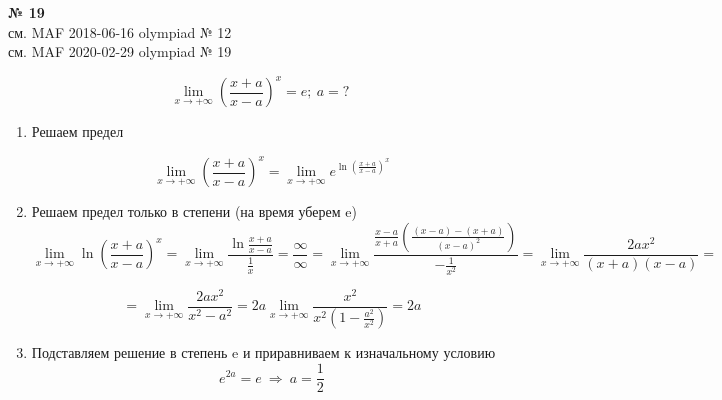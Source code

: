 \documentclass{article}
\begin{document}
\textbf{№ 19} 
\large
\\
см. {\color{blue}MAF} 2018-06-16 olympiad № 12 \\
см. {\color{blue}MAF} 2020-02-29 olympiad № 19

$$ \lim\limits_{x \to +\infty} \left( \frac{x+a}{x-a} \right)^x = e; \ a = ? $$  

\begin{enumerate}
\item Решаем предел

$$ \lim\limits_{x \to +\infty} \left( \frac{x+a}{x-a} \right)^x
= \lim\limits_{x \to +\infty} e^{\ln{\left( \frac{x+a}{x-a} \right)^x}} $$

\item Решаем предел только в степени (на время уберем e)
$$ \lim\limits_{x \to +\infty} \ln{\left( \frac{x+a}{x-a} \right)^x} 
= \lim\limits_{x \to +\infty} \frac{\ln{\frac{x+a}{x-a}}}{\frac{1}{x}}  
= \frac{\infty}{\infty}
= \lim\limits_{x \to +\infty} \frac{ \frac{x-a}{x+a} \left( \frac{(x-a)-(x+a)}{(x-a)^2} \right) }{-\frac{1}{x^2}} 
= \lim\limits_{x \to +\infty} \frac{2ax^2}{(x+a)(x-a)} 
= $$

$$ = \lim\limits_{x \to +\infty} \frac{2ax^2}{x^2-a^2}  
= 2a \lim\limits_{x \to +\infty} \frac{x^2}{x^2 \left(1 - \frac{a^2}{x^2} \right)} 
= 2a $$

\item Подставляем решение в степень e и приравниваем к изначальному условию
$$ e^{2a} = e \ \Rightarrow \ a = \frac{1}{2} $$

\end{enumerate}
\end{document}
